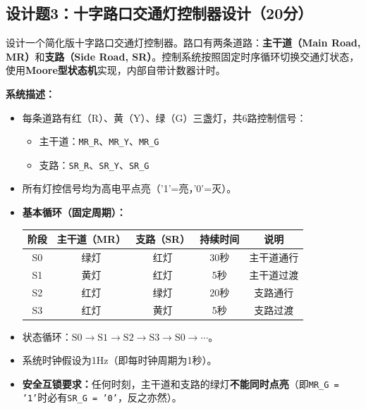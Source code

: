 \newpage

\subsection*{设计题3：十字路口交通灯控制器设计（20分）}

设计一个简化版十字路口交通灯控制器。路口有两条道路：\textbf{主干道（Main Road, MR）}和\textbf{支路（Side Road, SR）}。控制系统按照固定时序循环切换交通灯状态，使用\textbf{Moore型状态机}实现，内部自带计数器计时。

\vspace{0.3cm}

\textbf{系统描述：}

\begin{itemize}
  \item 每条道路有红（R）、黄（Y）、绿（G）三盏灯，共6路控制信号：
  \begin{itemize}
    \item 主干道：\texttt{MR\_R}、\texttt{MR\_Y}、\texttt{MR\_G}
    \item 支路：\texttt{SR\_R}、\texttt{SR\_Y}、\texttt{SR\_G}
  \end{itemize}
  \item 所有灯控信号均为高电平点亮（'1'=亮，'0'=灭）。
  \item \textbf{基本循环（固定周期）：}
  \begin{center}
  \begin{tabular}{|c|c|c|c|c|}
  \hline
  \textbf{阶段} & \textbf{主干道（MR）} & \textbf{支路（SR）} & \textbf{持续时间} & \textbf{说明} \\
  \hline
  S0 & 绿灯 & 红灯 & 30秒 & 主干道通行 \\
  S1 & 黄灯 & 红灯 & 5秒 & 主干道过渡 \\
  S2 & 红灯 & 绿灯 & 20秒 & 支路通行 \\
  S3 & 红灯 & 黄灯 & 5秒 & 支路过渡 \\
  \hline
  \end{tabular}
  \end{center}
  \item 状态循环：$\text{S0} \rightarrow \text{S1} \rightarrow \text{S2} \rightarrow \text{S3} \rightarrow \text{S0} \rightarrow \cdots$。
  \item 系统时钟假设为1Hz（即每时钟周期为1秒）。
  \item \textbf{安全互锁要求：}任何时刻，主干道和支路的绿灯\textbf{不能同时点亮}（即\texttt{MR\_G = '1'}时必有\texttt{SR\_G = '0'}，反之亦然）。
\end{itemize}

